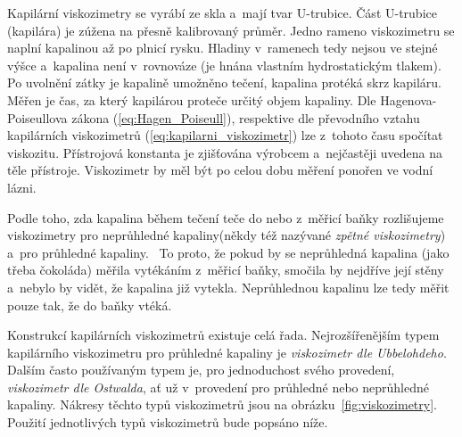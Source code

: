 \documentclass[12pt]{article}
\begin{document}
Kapilární viskozimetry se vyrábí ze skla a~mají tvar U-trubice. Část U-trubice (kapilára) je zúžena na přesně kalibrovaný průměr. Jedno rameno viskozimetru se naplní kapalinou až po plnicí rysku. Hladiny v~ramenech tedy nejsou ve stejné výšce a~kapalina není v~rovnováze (je hnána vlastním hydrostatickým tlakem). Po uvolnění zátky je kapalině umožněno tečení, kapalina protéká skrz kapiláru. Měřen je čas, za který kapilárou proteče určitý objem kapaliny. Dle Hagenova-Poiseullova zákona (\ref{eq:Hagen_Poiseull}), respektive dle převodního vztahu kapilárních viskozimetrů (\ref{eq:kapilarni_viskozimetr}) lze z~tohoto času spočítat viskozitu. Přístrojová konstanta je zjišťována výrobcem a~nejčastěji uvedena na těle přístroje. Viskozimetr by měl být po celou dobu měření ponořen ve vodní lázni.
\par
Podle toho, zda kapalina během tečení teče do nebo z~měřicí baňky rozlišujeme viskozimetry \glqq pro neprůhledné kapaliny\grqq\space(někdy též nazývané \emph{zpětné viskozimetry}) a~\glqq pro průhledné kapaliny\grqq.~\cite{book:Calibration_of_viscometers} To proto, že pokud by se neprůhledná kapalina (jako třeba čokoláda) měřila vytékáním z~měřicí baňky, smočila by nejdříve její stěny a~nebylo by vidět, že kapalina již vytekla. Neprůhlednou kapalinu lze tedy měřit pouze tak, že do baňky vtéká.
\par
Konstrukcí kapilárních viskozimetrů existuje celá řada. Nejrozšířenějším typem kapilárního viskozimetru pro průhledné kapaliny je \emph{viskozimetr dle Ubbelohdeho}. Dalším často používaným typem je, pro jednoduchost svého provedení, \emph{viskozimetr dle Ostwalda}, ať už v~provedení pro průhledné nebo neprůhledné kapaliny. Nákresy těchto typů viskozimetrů jsou na obrázku~\ref{fig:viskozimetry}. Použití jednotlivých typů viskozimetrů bude popsáno níže.
\end{document}
